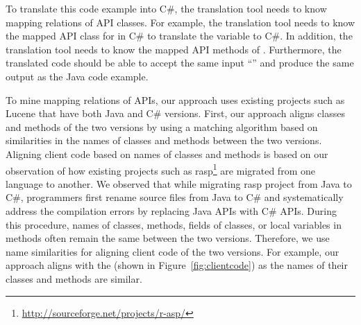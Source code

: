 To translate this code example into C\#, the translation
tool needs to know mapping relations of API classes. For example,
the translation tool needs to know the mapped API class for 
in C\# to translate the variable  to C\#. In addition, the translation tool needs
to know the mapped API methods of . Furthermore,
the translated code should be able to accept the same input
``'' and produce the same output as the Java code example.

To mine mapping relations of APIs, our approach uses existing projects such as
Lucene that have both Java and C\# versions. First, our approach aligns 
classes and methods of the two versions by using 
a matching algorithm based on similarities in the names of classes 
and methods between the two versions. Aligning client code based on names of
classes and methods is based on our observation of how existing
projects such as rasp\footnote{\url{http://sourceforge.net/projects/r-asp/}} are
migrated from one language to another. We observed that while
migrating rasp project from Java to C\#, programmers first rename
source files from Java to C\# and systematically address the
compilation errors by replacing Java APIs with C\# APIs. During this
procedure, names of classes, methods, fields of classes, or local
variables in methods often remain the same between the two versions.
Therefore, we use name similarities for aligning client code of the
two versions. For example, our approach aligns 
 with the  
(shown in Figure~\ref{fig:clientcode}) as the names of their classes and methods are similar.

